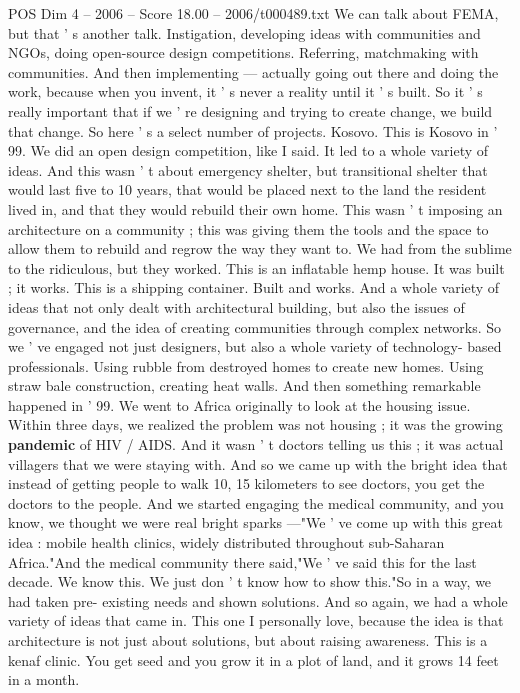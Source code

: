 \begin{textsample}{POS Dim 4 – 2006 – Score 18.00 – 2006/t000489.txt}
We can talk about FEMA, but that ' s another talk.
Instigation, developing ideas with communities and NGOs, doing open-source design competitions.
Referring, matchmaking with communities.
And then implementing — actually going out there and doing the work, because when you invent, it ' s never a reality until it ' s built.
So it ' s really important that if we ' re designing and trying to create change, we build that change.
So here ' s a select number of projects.
Kosovo.
This is Kosovo in ' 99.
We did an open design competition, like I said.
It led to a whole variety of ideas.
And this wasn ' t about emergency shelter, but transitional shelter that would last five to 10 years, that would be placed next to the land the resident lived in, and that they would rebuild their own home.
This wasn ' t imposing an architecture on a community ; this was giving them the tools and the space to allow them to rebuild and regrow the way they want to.
We had from the sublime to the ridiculous, but they worked.
This is an inflatable hemp house.
It was built ; it works.
This is a shipping container.
Built and works.
And a whole variety of ideas that not only dealt with architectural building, but also the issues of governance, and the idea of creating communities through complex networks.
So we ' ve engaged not just designers, but also a whole variety of technology- based professionals.
Using rubble from destroyed homes to create new homes.
Using straw bale construction, creating heat walls.
And then something remarkable happened in ' 99.
We went to Africa originally to look at the housing issue.
Within three days, we realized the problem was not housing ; it was the growing \textbf{pandemic} of HIV / AIDS.
And it wasn ' t doctors telling us this ; it was actual villagers that we were staying with.
And so we came up with the bright idea that instead of getting people to walk 10, 15 kilometers to see doctors, you get the doctors to the people.
And we started engaging the medical community, and you know, we thought we were real bright sparks —"We ' ve come up with this great idea : mobile health clinics, widely distributed throughout sub-Saharan Africa."And the medical community there said,"We ' ve said this for the last decade.
We know this.
We just don ' t know how to show this."So in a way, we had taken pre- existing needs and shown solutions.
And so again, we had a whole variety of ideas that came in.
This one I personally love, because the idea is that architecture is not just about solutions, but about raising awareness.
This is a kenaf clinic.
You get seed and you grow it in a plot of land, and it grows 14 feet in a month.

\end{textsample}
